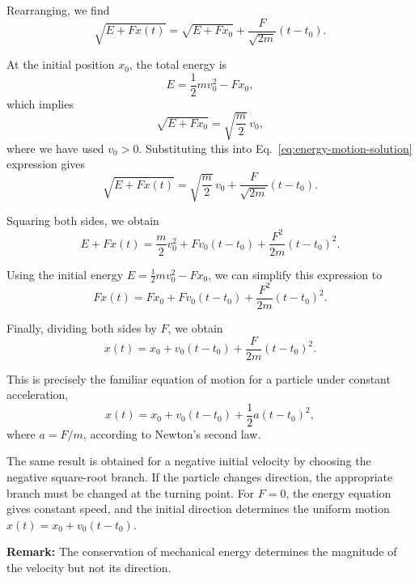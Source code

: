 \documentclass[12pt]{article}
\begin{document}
Rearranging, we find
\begin{equation}
    \sqrt{E+Fx(t)}
    =
    \sqrt{E+Fx_0}
    +\frac{F}{\sqrt{2m}}(t-t_0).
    \label{eq:energy-motion-solution}
\end{equation}

At the initial position $x_0$, the total energy is
\begin{equation}
    E = \frac{1}{2}mv_0^2-Fx_0,
\end{equation}
which implies
\begin{equation}
    \sqrt{E+Fx_0}
    = \sqrt{\frac{m}{2}}\,v_0,
\end{equation}
where we have used $v_0>0$. Substituting this into Eq.~\eqref{eq:energy-motion-solution} expression gives
\begin{equation}
    \sqrt{E+Fx(t)}
    =
    \sqrt{\frac{m}{2}}\,v_0
    +\frac{F}{\sqrt{2m}}(t-t_0).
\end{equation}

Squaring both sides, we obtain
\begin{equation}
    E+Fx(t)
    =
    \frac{m}{2}v_0^2
    +Fv_0(t-t_0)
    +\frac{F^2}{2m}(t-t_0)^2.
\end{equation}

Using the initial energy
$E=\frac{1}{2}mv_0^2-Fx_0$,
we can simplify this expression to
\begin{equation}
    Fx(t)
    =
    Fx_0+Fv_0(t-t_0)
    +\frac{F^2}{2m}(t-t_0)^2.
\end{equation}

Finally, dividing both sides by $F$, we obtain
\begin{equation}
    \boxed{
    x(t)=x_0+v_0(t-t_0)
    +\frac{F}{2m}(t-t_0)^2
    }.
\end{equation}

This is precisely the familiar equation of motion for a particle under constant acceleration,
\begin{equation}
    x(t)=x_0+v_0(t-t_0)
    +\frac{1}{2}a(t-t_0)^2,
\end{equation}
where $a=F/m$, according to Newton's second law.

The same result is obtained for a negative initial velocity by choosing the negative square-root branch. If the particle changes direction, the appropriate branch must be changed at the turning point. For $F=0$, the energy equation gives constant speed, and the initial direction determines the uniform motion
$x(t)=x_0+v_0(t-t_0)$.

\textbf{Remark:}
The conservation of mechanical energy determines the magnitude of the velocity but not its direction.
\end{document}
